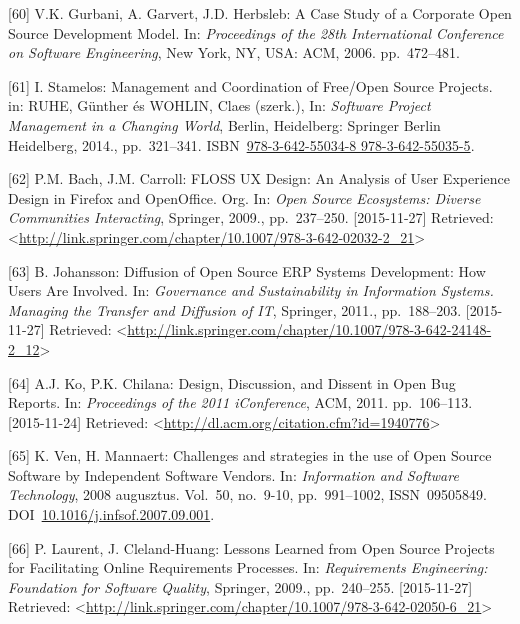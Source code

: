\documentclass[12pt,magyar,a4paper,oneside]{scrreprt}
\begin{document}
\leavevmode\hypertarget{ref-gurbani_case_2006}{}%
{[}60{]} V.K. Gurbani, A. Garvert, J.D. Herbsleb: A Case Study of a
Corporate Open Source Development Model. In: \emph{Proceedings of the
28th International Conference on Software Engineering}, New York, NY,
USA: ACM, 2006. pp.~472--481.

\leavevmode\hypertarget{ref-ruhe_management_2014}{}%
{[}61{]} I. Stamelos: Management and Coordination of Free/Open Source
Projects. in: RUHE, Günther és WOHLIN, Claes (szerk.), In:
\emph{Software Project Management in a Changing World}, Berlin,
Heidelberg: Springer Berlin Heidelberg, 2014., pp.~321--341.
ISBN~\href{https://worldcat.org/isbn/978-3-642-55034-8\%20978-3-642-55035-5}{978-3-642-55034-8 978-3-642-55035-5}.

\leavevmode\hypertarget{ref-bach_floss_2009}{}%
{[}62{]} P.M. Bach, J.M. Carroll: FLOSS UX Design: An Analysis of User
Experience Design in Firefox and OpenOffice. Org. In: \emph{Open Source
Ecosystems: Diverse Communities Interacting}, Springer, 2009.,
pp.~237--250. {[}2015-11-27{]} Retrieved:
\textless{}\url{http://link.springer.com/chapter/10.1007/978-3-642-02032-2_21}\textgreater{}

\leavevmode\hypertarget{ref-johansson_diffusion_2011}{}%
{[}63{]} B. Johansson: Diffusion of Open Source ERP Systems Development:
How Users Are Involved. In: \emph{Governance and Sustainability in
Information Systems. Managing the Transfer and Diffusion of IT},
Springer, 2011., pp.~188--203. {[}2015-11-27{]} Retrieved:
\textless{}\url{http://link.springer.com/chapter/10.1007/978-3-642-24148-2_12}\textgreater{}

\leavevmode\hypertarget{ref-ko_design_2011}{}%
{[}64{]} A.J. Ko, P.K. Chilana: Design, Discussion, and Dissent in Open
Bug Reports. In: \emph{Proceedings of the 2011 iConference}, ACM, 2011.
pp.~106--113. {[}2015-11-24{]} Retrieved:
\textless{}\url{http://dl.acm.org/citation.cfm?id=1940776}\textgreater{}

\leavevmode\hypertarget{ref-ven_challenges_2008}{}%
{[}65{]} K. Ven, H. Mannaert: Challenges and strategies in the use of
Open Source Software by Independent Software Vendors. In:
\emph{Information and Software Technology}, 2008 augusztus. Vol.~50,
no.~9-10, pp.~991--1002, ISSN~09505849.
DOI~\href{https://doi.org/10.1016/j.infsof.2007.09.001}{10.1016/j.infsof.2007.09.001}.

\leavevmode\hypertarget{ref-laurent_lessons_2009}{}%
{[}66{]} P. Laurent, J. Cleland-Huang: Lessons Learned from Open Source
Projects for Facilitating Online Requirements Processes. In:
\emph{Requirements Engineering: Foundation for Software Quality},
Springer, 2009., pp.~240--255. {[}2015-11-27{]} Retrieved:
\textless{}\url{http://link.springer.com/chapter/10.1007/978-3-642-02050-6_21}\textgreater{}
\end{document}
